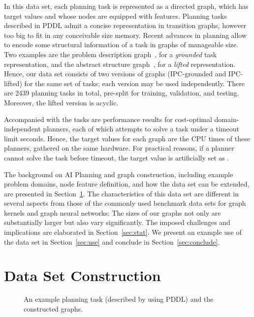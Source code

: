 \documentclass{article}
\begin{document}
In this data set, each planning task is represented as a directed graph, which
has target values
and whose nodes
are equipped with features. Planning tasks described in PDDL
admit a concise representation in transition graphs, however too big to fit in
any conceivable size memory. 
Recent advances in planning allow to encode some structural information of a
 task in graphs of manageable size. Two examples are the problem
description graph~\citep{pochter-et-al-aaai2011}, for a \emph{grounded} task
representation, and the abstract structure
graph~\citep{sievers-et-al-icaps2019}, for a \emph{lifted} representation.
Hence, our data set consists of two versions of graphs (IPC-grounded and
IPC-lifted) for the same set of tasks; each version may be used independently.
There are 2439 planning tasks in total, pre-split for training, validation, and
testing.
Moreover, the lifted version is acyclic.

Accompanied with the tasks are performance results for  cost-optimal
domain-independent planners, each of which attempts to solve a task under a
timeout limit  seconds. Hence, the target values for each graph are the
CPU times of these planners, gathered on the same hardware. For practical
reasons, if a planner cannot solve the task before timeout, the target value is
artificially set as .

The background on AI Planning and graph construction, including example problem
domains, node feature definition, and how the data set can be extended, are
presented in Section~\ref{sec:construction}.
The characteristics of this data set are different in several aspects from those
of the commonly used benchmark data sets for graph kernels and graph neural
networks: The sizes of our graphs not only are substantially larger but also
vary significantly. The imposed challenges and implications
are elaborated in Section~\ref{sec:stat}.
We present an example use of the data set in Section~\ref{sec:use} and conclude
in Section~\ref{sec:conclude}.


\section{Data Set Construction}\label{sec:construction}

\begin{figure*}[ht]
\centering
{}\hfill
{}\hfill
{}
\caption{An example planning task (described by using PDDL) and the constructed graphs.}
\label{fig:example}
\end{figure*}
\end{document}
